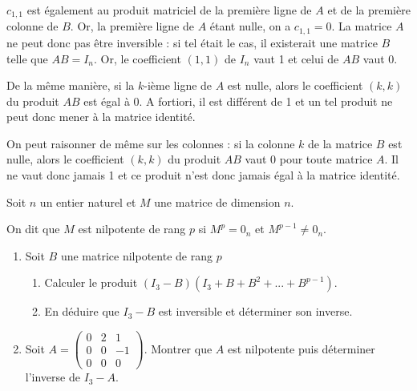 \documentclass[11pt,fleqn]{book} %
\begin{document}
\begin{solution}\(c_{1,1}\) est également au produit matriciel de la première ligne de \(A\) et de la première colonne de \(B\). Or, la première ligne de \(A\) étant nulle, on a \(c_{1,1} = 0\). La matrice \(A\) ne peut donc pas être inversible : si tel était le cas, il existerait une matrice \(B\) telle que \(AB=I_n\). Or, le coefficient \((1,1)\) de \(I_n\) vaut 1 et celui de \(AB\) vaut 0.

De la même manière, si la \(k\)-ième ligne de \(A\) est nulle, alors le coefficient \((k,k)\) du produit \(AB\) est égal à 0. A fortiori, il est différent de 1 et un tel produit ne peut donc mener à la matrice identité.

On peut raisonner de même sur les colonnes : si la colonne \(k\) de la matrice \(B\) est nulle, alors le coefficient \((k,k)\) du produit \(AB\) vaut 0 pour toute matrice \(A\). Il ne vaut donc jamais 1 et ce produit n'est donc jamais égal à la matrice identité.\end{solution}



\begin{exercise}[topic=mat03]Soit $n$ un entier naturel et $M$ une matrice de dimension $n$. 

On dit que $M$ est nilpotente de rang $p$ si $M^p=0_n$ et $M^{p-1}\neq 0_n$.
\begin{enumerate}
\item Soit $B$ une matrice nilpotente de rang $p$
\begin{enumerate}
\item Calculer le produit $(I_3-B)(I_3+B+B^2+...+B^{p-1})$.
\item En déduire que $I_3-B$ est inversible et déterminer son inverse.
\end{enumerate}
\item Soit $A = \begin{pmatrix} 0 & 2 & 1 \\ 0 & 0 & -1 \\ 0 & 0 & 0\end{pmatrix}$. Montrer que $A$ est nilpotente puis déterminer l'inverse de $I_3-A$.\end{enumerate} \newpage \end{exercise}
\end{document}
